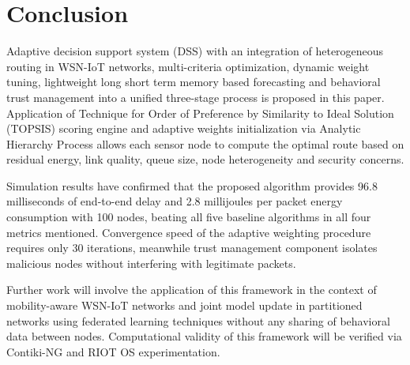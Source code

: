 \documentclass[a4paper,fleqn]{cas-dc}
\numberwithin{equation}{section}
\begin{document}
\section{Conclusion}
\label{sec:conclusion}

Adaptive decision support system (DSS) with an integration of heterogeneous routing in WSN-IoT networks, multi-criteria optimization, dynamic weight tuning,
lightweight long short term memory based forecasting and behavioral trust management into a unified three-stage process is proposed in this paper.
Application of Technique for Order of Preference by Similarity to Ideal Solution (TOPSIS) scoring engine and adaptive weights initialization via
Analytic Hierarchy Process allows each sensor node to compute the optimal route based on residual energy, link quality, queue size, node
heterogeneity and security concerns.

Simulation results have confirmed that the proposed algorithm provides 96.8%
milliseconds of end-to-end delay and 2.8 millijoules per packet energy consumption with 100 nodes, beating all five baseline algorithms in all four
metrics mentioned. Convergence speed of the adaptive weighting procedure requires only 30 iterations, meanwhile trust management component
isolates malicious nodes without interfering with legitimate packets.

Further work will involve the application of this framework in the context of mobility-aware WSN-IoT networks and joint model update in partitioned
networks using federated learning techniques without any sharing of behavioral data between nodes. Computational validity of this framework will be
verified via Contiki-NG and RIOT OS experimentation.

\FloatBarrier



\end{document}
